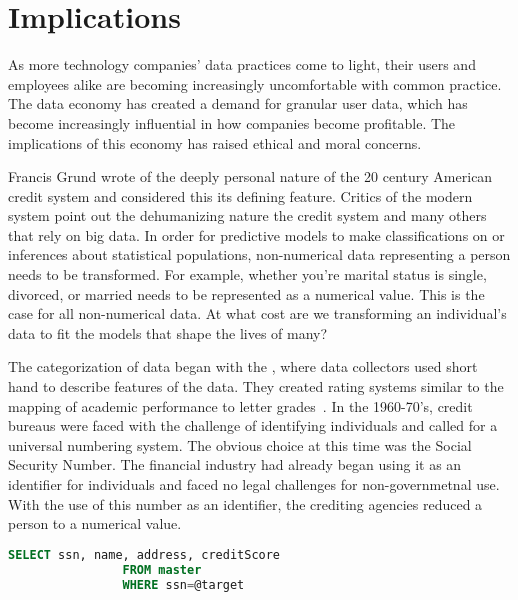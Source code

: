 \section{Implications}

As more technology companies' data practices come to light, their users and
employees alike are becoming increasingly uncomfortable with common practice.
The data economy has created a demand for granular user data, which has become
increasingly influential in how companies become profitable. The implications
of this economy has raised ethical and moral concerns.


Francis Grund wrote of the deeply personal nature of the 20 century
American credit system and considered this its defining feature. Critics of the
modern system point out the dehumanizing nature the credit system and many
others that rely on big data. In order for predictive models to make
classifications on or inferences about statistical populations, non-numerical
data representing a person needs to be transformed. For example, whether you're marital status is
single, divorced, or married needs to be represented as a numerical value. This
is the case for all non-numerical data. At what cost are we transforming an individual's data to fit the
models that shape the lives of many?

The categorization of data began with the \mca, where data collectors used
short hand to describe features of the data. They created rating systems
similar to the mapping of academic performance to letter
grades~\cite{lauer2017creditworthy}. In the 1960-70's, credit bureaus were faced
with the challenge of identifying individuals and called for a universal
numbering system. The obvious choice at this time was the Social Security
Number. The financial industry had already began using it as an identifier for
individuals and faced no legal challenges for non-governmetnal use. With the
use of this number as an identifier, the crediting agencies reduced a person to
a numerical value.

\begin{center}
\begin{lstlisting}[language=SQL, basicstyle=\sffamily]
		SELECT ssn, name, address, creditScore
				FROM master
				WHERE ssn=@target
\end{lstlisting}
\end{center}

